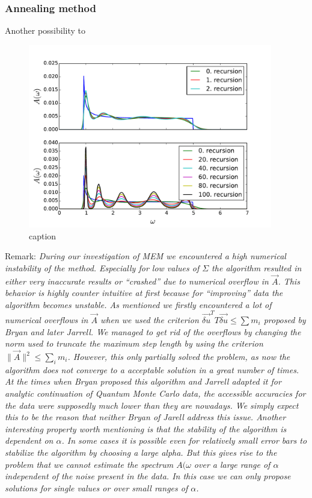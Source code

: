\subsubsection*{Annealing method}
Another possibility to

\begin{figure}[htbp]
	\centering
	\includegraphics[width=0.95\textwidth]{./images/BCS_annealing_example.pdf}
	\caption{caption}
	\label{results:fig_7}
\end{figure}
\FloatBarrier

Remark:\newline
\textit{During our investigation of MEM we encountered a high numerical instability of the method. Especially for low values of $\Sigma$ the algorithm resulted in either very inaccurate results or ``crashed'' due to numerical overflow in $\vec A$. This behavior is highly counter intuitive at first because for ``improving'' data the algorithm becomes unstable. As mentioned we firstly encountered a lot of numerical overflows in $\vec A$ when we used the criterion $\vec{\delta u}^T T \vec{\delta u} \leq \sum m_i$ proposed by Bryan and later Jarrell. We managed to get rid of the overflows by changing the norm used to truncate the maximum step length by using the criterion $\parallel \vec A \parallel^2 \leq \sum_i m_i$. However, this only partially solved the problem, as now the algorithm does not converge to a acceptable solution in a great number of times. At the times when Bryan proposed this algorithm and Jarrell adapted it for analytic continuation of Quantum Monte Carlo data, the accessible accuracies for the data were supposedly much lower than they are nowadays. We simply expect this to be the reason that neither Bryan of Jarell address this issue. Another interesting property worth mentioning is that the stability of the algorithm is dependent on $\alpha$. In some cases it is possible even for relatively small error bars to stabilize the algorithm by choosing a large alpha. But this gives rise to the problem that we cannot estimate the spectrum $A(\omega$ over a large range of $\alpha$ independent of the noise present in the data. In this case we can only propose solutions for single values or over small ranges of $\alpha$.}
